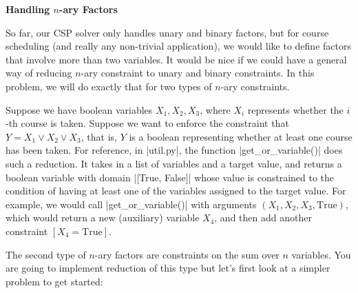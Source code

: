 \item {\bf Handling $n$-ary Factors}

So far, our CSP solver only handles unary and binary factors, but for course
scheduling (and really any non-trivial application), we would like to define
factors that involve more than two variables. It would be nice if we could have
a general way of reducing $n$-ary constraint to unary and binary constraints.
In this problem, we will do exactly that for two types of $n$-ary constraints.

Suppose we have boolean variables $X_1, X_2, X_3$, where $X_i$ represents
whether the $i$-th course is taken. Suppose we want to enforce the constraint
that $Y = X_1 \vee X_2 \vee X_3$, that is, $Y$ is a boolean representing whether
at least one course has been taken. For reference, in |util.py|, the function
|get_or_variable()| does such a reduction. It takes in a list of variables and a
target value, and returns a boolean variable with domain |[True, False]| whose
value is constrained to the condition of having at least one of the variables
assigned to the target value. For example, we would call |get_or_variable()|
with arguments $(X_1,X_2,X_3,\text{True})$, which would return a new (auxiliary)
variable $X_4$, and then add another constraint $[X_4=\text{True}]$.

The second type of $n$-ary factors are constraints on the sum over $n$
variables. You are going to implement reduction of this type but let's first
look at a simpler problem to get started:

\begin{enumerate}

  

  

\end{enumerate}
